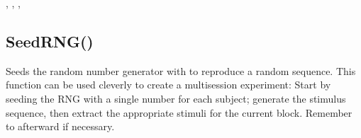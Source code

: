 \documentclass[letterpaper,10pt,english]{sphinxmanual}
\begin{document}
\sphinxAtStartPar
{}

\begin{sphinxVerbatim}[commandchars=\\\{\}]
\end{sphinxVerbatim}

\sphinxAtStartPar
{}

\begin{sphinxVerbatim}[commandchars=\\\{\}]
\end{sphinxVerbatim}

\sphinxAtStartPar
{}

\sphinxAtStartPar
{}, , , 


\subsection{SeedRNG()}
\label{\detokenize{reference/peblmath:seedrng}}
\sphinxAtStartPar
{}

\sphinxAtStartPar
Seeds the random number generator with    to reproduce a random sequence.  This function can be used cleverly   to create a multi\sphinxhyphen{}session experiment: Start by seeding the RNG with   a single number for each subject; generate the stimulus sequence,   then extract the appropriate stimuli for the current block. Remember   to  afterward if necessary.

\sphinxAtStartPar
{}

\begin{sphinxVerbatim}[commandchars=\\\{\}]
\end{sphinxVerbatim}
\end{document}
